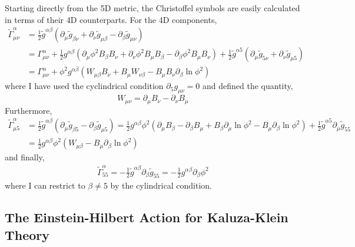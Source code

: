 \documentclass[11pt, a4paper]{article}
\begin{document}
Starting directly from the 5D metric, the Christoffel symbols are easily calculated in terms of their 4D counterparts. For the 4D components,
\begin{align*}
\tilde{\Gamma}^{\alpha}_{\mu \nu} & = \frac{1}{2} \tilde{g}^{\alpha \beta} \left( \partial_\mu \tilde{g}_{\beta \nu} + \partial_{\nu} \tilde{g}_{\mu \beta} - \partial_{\beta} \tilde{g}_{\mu \nu} \right)
\\
& = \Gamma^\alpha_{\mu \nu}  + \frac{1}{2} g^{\alpha \beta} \left( \partial_\mu \phi^2 B_\beta B_\nu + \partial_\nu \phi^2 B_\mu B_\beta - \partial_\beta \phi^2 B_\mu B_\nu \right) + \frac{1}{2} \tilde{g}^{\alpha 5} \left( \partial_\mu \tilde{g}_{5 \nu} + \partial_\nu \tilde{g}_{\mu 5} \right) 
\\
& = \Gamma^\alpha_{\mu \nu} + \phi^2 g^{\alpha \beta} \left(W_{\mu \beta} B_\nu + B_\mu W_{\nu \beta} - B_\mu B_\nu \partial_\beta \ln{\phi^2} \right)
\end{align*}
where I have used the cyclindrical condition $\partial_5 g_{\mu \nu} = 0$ and defined the quantity,
\[ W_{\mu \nu} = \partial_\mu B_\nu - \partial_\nu B_\mu \]
Furthermore,
\begin{align*} 
\tilde{\Gamma}^\alpha_{\mu 5} & = \frac{1}{2} \tilde{g}^{\alpha \beta} \left( \partial_\mu \tilde{g}_{\beta 5} - \partial_\beta \tilde{g}_{\mu 5}  \right) = \frac{1}{2} g^{\alpha \beta} \phi^2 \left( \partial_\mu B_\beta - \partial_\beta B_\mu + B_\beta \partial_\mu \ln{\phi^2} - B_\mu \partial_\beta \ln{\phi^2}  \right) + \frac{1}{2} \tilde{g}^{\alpha 5} \partial_{\mu} \tilde{g}_{55}
\\
& = \frac{1}{2} g^{\alpha \beta} \phi^2 \left( W_{\mu \beta} - B_\mu \partial_\beta \ln{\phi^2}  \right) 
\end{align*}
and finally,
\begin{align*}
\tilde{\Gamma}^\alpha_{55} = - \frac{1}{2} \tilde{g}^{\alpha \beta} \partial_{\beta} \tilde{g}_{55} = - \frac{1}{2} g^{\alpha \beta} \partial_{\beta} \phi^2
\end{align*}
where I can restrict to $\beta \neq 5$ by the cylindrical condition.


\subsection{The Einstein-Hilbert Action for Kaluza-Klein Theory}
\end{document}
